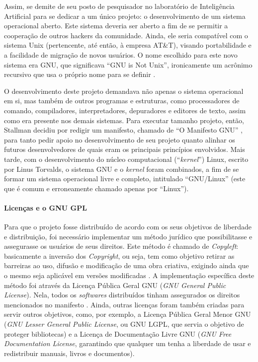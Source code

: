 \documentclass[12pt]{article}
\begin{document}
Assim, se demite de seu posto de pesquisador no laboratório de Inteligência Artificial para se dedicar a um único projeto: o desenvolvimento de um sistema operacional aberto. Este sistema deveria ser aberto a fim de se permitir a cooperação de outros hackers da comunidade. Ainda, ele seria compatível com o sistema Unix (pertencente, até então, à empresa AT\&T), visando portabilidade e a facilidade de migração de novos usuários. O nome escolhido para este novo sistema era GNU, que significava ``GNU is Not Unix'', ironicamente um acrônimo recursivo que usa o próprio nome para se definir \cite{wiki_gnu, Stallman_gnu2019}.

O desenvolvimento deste projeto demandava não apenas o sistema operacional em si, mas também de outros programas e estruturas, como processadores de comando, compiladores, interpretadores, depuradores e editores de texto, assim como era presente nos demais sistemas. Para executar tamanho projeto, então, Stallman decidiu por redigir um manifesto, chamado de ``O Manifesto GNU'' \cite{Stallman_manifesto2019}, para tanto pedir apoio no desenvolvimento de seu projeto quanto alinhar os futuros desenvolvedores de quais eram os principais princípios envolvidos. Mais tarde, com o desenvolvimento do núcleo computacional (``\textit{kernel}'') Linux, escrito por Linus Torvalds, o sistema GNU e o \textit{kernel} foram combinados, a fim de se formar um sistema operacional livre e completo, intitulado ``GNU/Linux'' \cite{Stallman_gnulinux2019} (este que é comum e erroneamente chamado apenas por ``Linux'').

\paragraph{Licenças e o GNU GPL}
Para que o projeto fosse distribuído de acordo com os seus objetivos de liberdade e distribuição, foi necessário implementar um método jurídico que possibilitasse e assegurasse os usuários de seus direitos. Este método é chamado de \textit{Copyleft}: basicamente a inversão dos \textit{Copyright}, ou seja, tem como objetivo retirar as barreiras ao uso, difusão e modificação de uma obra criativa, exigindo ainda que o mesmo seja aplicável em versões modificadas \cite{wiki_copyleft}. A implementação específica deste método foi através da Licença Pública Geral GNU (\textit{GNU General Public License}). Nela, todos os \textit{softwares} distribuídos tinham assegurados os direitos mencionados no manifesto \cite{Brett2019}. Ainda, outras licenças foram também criadas para servir outros objetivos, como, por exemplo, a Licença Pública Geral Menor GNU (\textit{GNU Lesser General Public License}, ou GNU LGPL, que servia o objetivo de proteger bibliotecas) e a Licença de Documentação Livre GNU (\textit{GNU Free Documentation License}, garantindo que qualquer um tenha a liberdade de usar e redistribuir manuais, livros e documentos).
\end{document}
